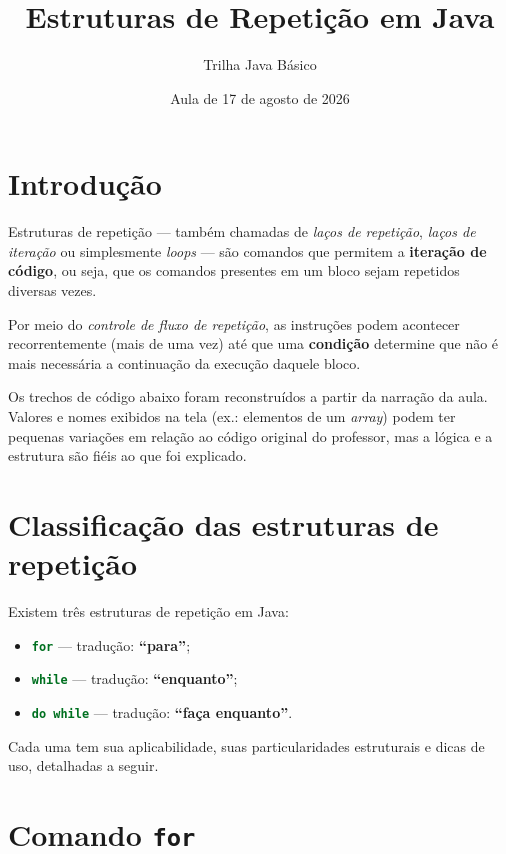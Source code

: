 \documentclass[12pt,a4paper]{article}
\title{\textbf{Estruturas de Repetição em Java}}
\author{Trilha Java Básico}
\date{Aula de 17 de agosto de 2026}
\newcommand{\codigo}[1]{\lstinline[language=Java,basicstyle=\ttfamily\small]|#1|}
\begin{document}
\maketitle
\tableofcontents
\newpage

\section{Introdução}

Estruturas de repetição --- também chamadas de \emph{laços de repetição},
\emph{laços de iteração} ou simplesmente \emph{loops} --- são comandos que
permitem a \textbf{iteração de código}, ou seja, que os comandos presentes em um
bloco sejam repetidos diversas vezes.

Por meio do \emph{controle de fluxo de repetição}, as instruções podem acontecer
recorrentemente (mais de uma vez) até que uma \textbf{condição} determine que
não é mais necessária a continuação da execução daquele bloco.

\begin{observacao}
Os trechos de código abaixo foram reconstruídos a partir da narração da aula.
Valores e nomes exibidos na tela (ex.: elementos de um \emph{array}) podem ter
pequenas variações em relação ao código original do professor, mas a lógica e a
estrutura são fiéis ao que foi explicado.
\end{observacao}

\section{Classificação das estruturas de repetição}

Existem três estruturas de repetição em Java:

\begin{itemize}
  \item \codigo{for} --- tradução: \textbf{``para''};
  \item \codigo{while} --- tradução: \textbf{``enquanto''};
  \item \codigo{do while} --- tradução: \textbf{``faça enquanto''}.
\end{itemize}

Cada uma tem sua aplicabilidade, suas particularidades estruturais e dicas de
uso, detalhadas a seguir.

\section{Comando \texttt{for}}
\end{document}
